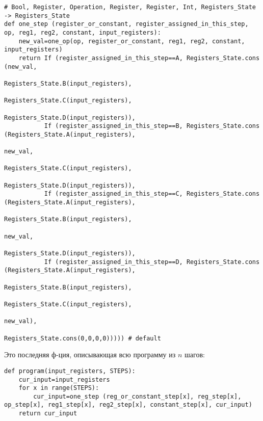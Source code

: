 \begin{lstlisting}
# Bool, Register, Operation, Register, Register, Int, Registers_State -> Registers_State
def one_step (register_or_constant, register_assigned_in_this_step, op, reg1, reg2, constant, input_registers):
    new_val=one_op(op, register_or_constant, reg1, reg2, constant, input_registers)
    return If (register_assigned_in_this_step==A, Registers_State.cons (new_val,
                                                                        Registers_State.B(input_registers), 
                                                                        Registers_State.C(input_registers), 
                                                                        Registers_State.D(input_registers)),
           If (register_assigned_in_this_step==B, Registers_State.cons (Registers_State.A(input_registers), 
                                                                        new_val,
                                                                        Registers_State.C(input_registers),
                                                                        Registers_State.D(input_registers)), 
           If (register_assigned_in_this_step==C, Registers_State.cons (Registers_State.A(input_registers), 
                                                                        Registers_State.B(input_registers), 
                                                                        new_val,
                                                                        Registers_State.D(input_registers)), 
           If (register_assigned_in_this_step==D, Registers_State.cons (Registers_State.A(input_registers), 
                                                                        Registers_State.B(input_registers), 
                                                                        Registers_State.C(input_registers), 
                                                                        new_val),
                                                  Registers_State.cons(0,0,0,0))))) # default
\end{lstlisting}

Это последняя ф-ция, описывающая всю программу из $n$ шагов:

\begin{lstlisting}
def program(input_registers, STEPS):
    cur_input=input_registers
    for x in range(STEPS):
        cur_input=one_step (reg_or_constant_step[x], reg_step[x], op_step[x], reg1_step[x], reg2_step[x], constant_step[x], cur_input)
    return cur_input
\end{lstlisting}

